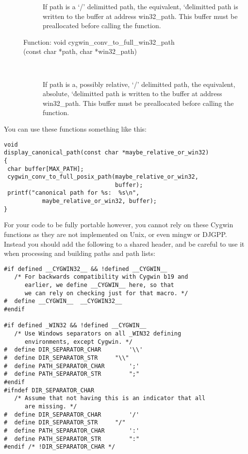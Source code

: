 \begin{description}
\begin{description}
    If path is a `/' delimitted path, the equivalent, `\' delimitted path is written to the buffer at address win32\_{}path. This buffer must be preallocated before calling the function. 

\item[Function: void cygwin\_{}conv\_{}to\_{}full\_{}win32\_{}path]
\item[(const char *path, char *win32\_{}path)]
\

    If path is a, possibly relative, `/' delimitted path, the equivalent, absolute, `\' delimitted path is written to the buffer at address win32\_{}path. This buffer must be preallocated before calling the function. 
\end{description}

\end{description}

You can use these functions something like this:

\begin{Verbatim}[frame=single]
void 
display_canonical_path(const char *maybe_relative_or_win32)
{  
 char buffer[MAX_PATH];
 cygwin_conv_to_full_posix_path(maybe_relative_or_win32,
                                buffer);
 printf("canonical path for %s:  %s\n",
           maybe_relative_or_win32, buffer);
}
\end{Verbatim}

For your code to be fully portable however, you cannot rely on these Cygwin functions as they are not implemented on Unix, or even mingw or DJGPP. Instead you should add the following to a shared header, and be careful to use it when processing and building paths and path lists:

\begin{Verbatim}[frame=single]
#if defined __CYGWIN32__ && !defined __CYGWIN__
   /* For backwards compatibility with Cygwin b19 and
      earlier, we define __CYGWIN__ here, so that
      we can rely on checking just for that macro. */
#  define __CYGWIN__  __CYGWIN32__
#endif

#if defined _WIN32 && !defined __CYGWIN__
   /* Use Windows separators on all _WIN32 defining
      environments, except Cygwin. */
#  define DIR_SEPARATOR_CHAR		'\\'
#  define DIR_SEPARATOR_STR		"\\"
#  define PATH_SEPARATOR_CHAR		';'
#  define PATH_SEPARATOR_STR		";"
#endif
#ifndef DIR_SEPARATOR_CHAR
   /* Assume that not having this is an indicator that all
      are missing. */
#  define DIR_SEPARATOR_CHAR		'/'
#  define DIR_SEPARATOR_STR		"/"
#  define PATH_SEPARATOR_CHAR		':'
#  define PATH_SEPARATOR_STR		":"
#endif /* !DIR_SEPARATOR_CHAR */
\end{Verbatim}

